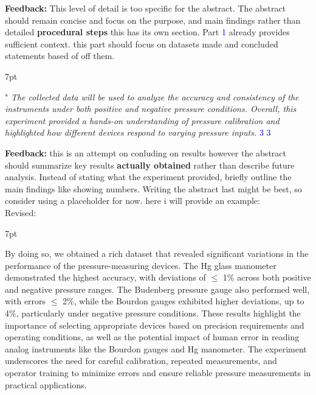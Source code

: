 \documentclass{article}
\newcommand{\formalsource}{} %
\newenvironment{formal}[3][]{%
	\renewcommand{\formalsource}{#1}%
	\def\FrameCommand{%
		\hspace{1pt}%
		{\color{#2}\vrule width 2pt}%
		{\color{#3}\vrule width 4pt}%
		\colorbox{#3}%
	}%
	\MakeFramed{\advance\hsize-\width\FrameRestore}%
	\noindent\hspace{-4.55pt}%
	\begin{adjustwidth}{}{7pt}%
		\vspace{2pt}%
	}%
	{%
		\vspace{4pt}%
		\ifx\formalsource\empty %
		\else
		\hfill{\footnotesize{\formalsource}}%
		\fi
	\end{adjustwidth}\endMakeFramed%
}
\begin{document}
\noindent\textbf{Feedback:} This level of detail is too specific for the abstract. The abstract should remain concise and focus on the purpose, and main findings rather than detailed \textbf{procedural steps} this has its own section. Part \textcolor{blue}{1} already provides sufficient context. this part should focus on datasets made and concluded statements based of off them.
\begin{formal}[\textcolor{blue}{3}]{blue!40!black}{blue!10!white}
	\Large" \large \textit{The collected data will be used to analyze the accuracy and consistency of the instruments under both positive and negative pressure conditions. Overall, this experiment provided a hands-on understanding of pressure calibration and highlighted how different devices respond to varying pressure inputs.} 
\end{formal}
\noindent\textbf{Feedback:} this is an attempt on conluding on results however the abstract should summarize key results \textbf{actually obtained} rather than describe future analysis. Instead of stating what the experiment provided, briefly outline the main findings like showing numbers. Writing the abstract last might be best, so consider using a placeholder for now. here i will provide an example:\\[1em]
Revised:
\begin{formal}{green!40!black}{green!10!white}
By doing so, we obtained a rich dataset that revealed significant variations in the performance of the pressure-measuring devices. The Hg glass manometer demonstrated the highest accuracy, with deviations of $\leq$ 1\% across both positive and negative pressure ranges. The Budenberg pressure gauge also performed well, with errors $\leq$ 2\%, while the Bourdon gauges exhibited higher deviations, up to 4\%, particularly under negative pressure conditions.  These results highlight the importance of selecting appropriate devices based on precision requirements and operating conditions, as well as the potential impact of human error in reading analog instruments like the Bourdon gauges and Hg manometer. The experiment underscores the need for careful calibration, repeated measurements, and operator training to minimize errors and ensure reliable pressure measurements in practical applications.
\end{formal}
\end{document}
